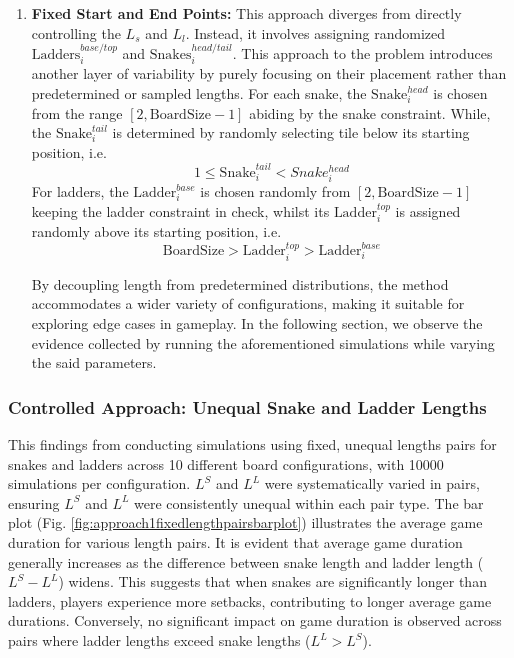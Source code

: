 \begin{enumerate}
	\item \textbf{Fixed Start and End Points:} This approach diverges from directly controlling the $L_s$ and $L_l$. Instead, it involves assigning randomized $\text{Ladders}^{base/top}_i$ and $\text{Snakes}^{head/tail}_i$. This approach to the problem introduces another layer of variability by purely focusing on their placement rather than predetermined or sampled lengths.
	For each snake, the $\text{Snake}^{head}_i$ is chosen from the range $[2, \text{BoardSize} - 1]$ abiding by the snake constraint. While, the $\text{Snake}^{tail}_i$ is determined by randomly selecting tile below its starting position, i.e. $$1\leq \text{Snake}^{tail}_i < Snake^{head}_i$$ 
	For ladders, the $\text{Ladder}^{base}_i$ is chosen randomly from $[2, \text{BoardSize} - 1]$ keeping the ladder constraint in check, whilst its $\text{Ladder}^{top}_i$ is assigned randomly above its starting position, i.e. $$\text{BoardSize}>\text{Ladder}^{top}_i>\text{Ladder}^{base}_i$$ 
	
	By decoupling length from predetermined distributions, the method accommodates a wider variety of configurations, making it suitable for exploring edge cases in gameplay. In the following section, we observe the evidence collected by running the aforementioned simulations while varying the said parameters.
\end{enumerate}


\subsubsection{Controlled Approach: Unequal Snake and Ladder Lengths}

This findings from conducting simulations using fixed, unequal lengths pairs for snakes and ladders across 10 different board configurations, with 10000 simulations per configuration. $L^S$ and $L^L$ were  systematically varied in pairs, ensuring $L^S$ and $L^L$ were consistently unequal within each pair type. The bar plot (Fig. \ref{fig:approach1fixedlengthpairsbarplot}) illustrates the average game duration for various length pairs. It is evident that average game duration generally increases as the difference between snake length and ladder length ($L^S - L^L$) widens. This suggests that when snakes are significantly longer than ladders, players experience more setbacks, contributing to longer average game durations. Conversely, no significant impact on game duration is observed across pairs where ladder lengths exceed snake lengths ($L^L > L^S$).

